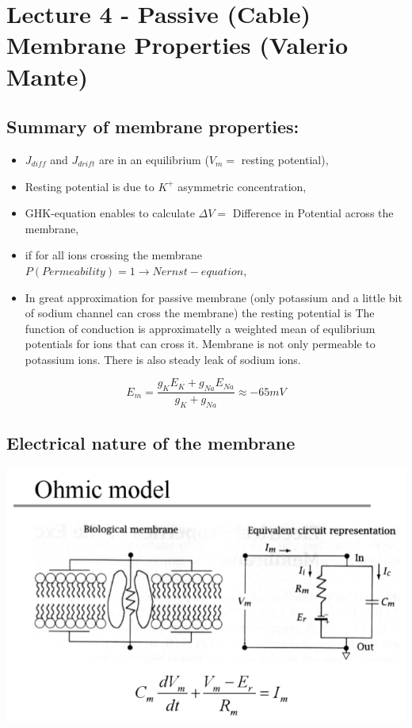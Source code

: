 \documentclass[english,11pt]{article}
\begin{document}
\newpage
\section{Lecture 4 - Passive (Cable) Membrane Properties (Valerio Mante)}


\subsection{Summary of membrane properties:}
\begin{itemize}
\item $J_{diff}$ and $J_{drift}$ are in an equilibrium ($V_m =$ resting potential),
\item Resting potential is due to $K^+$ asymmetric concentration,
\item GHK-equation enables to calculate $\Delta V = $ Difference in Potential across the membrane,
\item if for all ions crossing the membrane $P(Permeability) = 1 \rightarrow Nernst-equation$,
\item 
In great approximation for passive membrane (only potassium and a little bit of sodium channel can cross the membrane) the resting potential is The function of conduction is approximatelly a weighted mean of equlibrium potentials for ions that can cross it. Membrane is not only permeable to potassium ions. There is also steady leak of sodium ions.
\end{itemize}
\begin{equation}
E_m = \frac{g_K E_K+g_{Na} E_{Na}}{g_K+g_{Na}} \approx -65 mV
\end{equation}



\subsection{Electrical nature of the membrane}
 \includegraphics[scale = 0.5]{ohmic-model.png}
 
\end{document}
